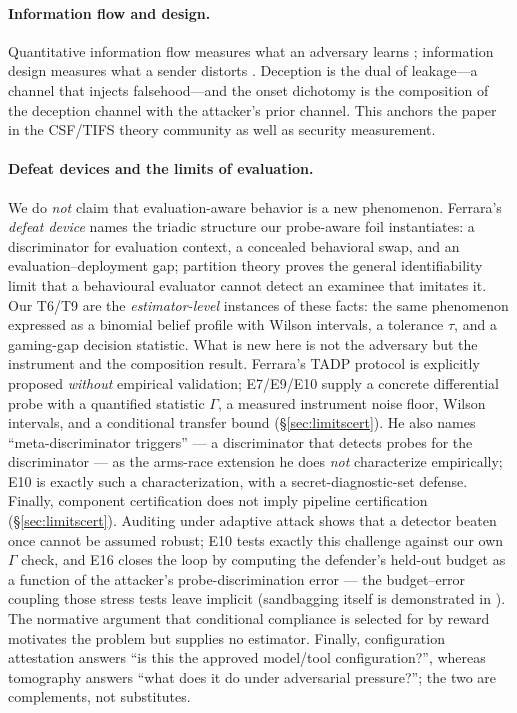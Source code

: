 \documentclass[acmsmall,review,anonymous]{acmart}
\begin{document}
\paragraph{Information flow and design.}
Quantitative information flow measures what an adversary learns
\cite{smith2009,alvim2012}; information design measures what a sender distorts
\cite{kamenica2011}. Deception is the dual of leakage---a channel that injects
falsehood---and the onset dichotomy is the composition of the deception channel
with the attacker's prior channel. This anchors the paper in the CSF/TIFS
theory community as well as security measurement.

\paragraph{Defeat devices and the limits of evaluation.}
We do \emph{not} claim that evaluation-aware behavior is a new phenomenon.
Ferrara's \emph{defeat device} \cite{ferrara2026} names the triadic structure
our probe-aware foil instantiates: a discriminator for evaluation context, a
concealed behavioral swap, and an evaluation--deployment gap; partition theory
\cite{mahran2026} proves the general identifiability limit that a behavioural
evaluator cannot detect an examinee that imitates it. Our T6/T9 are the
\emph{estimator-level} instances of these facts: the same phenomenon expressed
as a binomial belief profile with Wilson intervals, a tolerance $\tau$, and a
gaming-gap decision statistic. What is new here is not the adversary but the
instrument and the composition result. Ferrara's TADP protocol is explicitly
proposed \emph{without} empirical validation; E7/E9/E10 supply a concrete
differential probe with a quantified statistic $\Gamma$, a measured instrument
noise floor, Wilson intervals, and a conditional transfer bound
(\S\ref{sec:limitscert}). He also names ``meta-discriminator triggers'' --- a
discriminator that detects probes for the discriminator --- as the arms-race
extension he does \emph{not} characterize empirically; E10 is exactly such a
characterization, with a secret-diagnostic-set defense. Finally, component
certification does not imply pipeline certification (\S\ref{sec:limitscert}).
Auditing under adaptive attack \cite{soopal2026,duddu2026,auditinggames2025}
shows that a detector beaten once cannot be assumed robust; E10 tests exactly
this challenge against our own $\Gamma$ check, and E16 closes the loop by
computing the defender's held-out budget as a function of the attacker's
probe-discrimination error --- the budget--error coupling those stress tests
leave implicit (sandbagging itself is demonstrated in
\cite{aisandbagging2024}). The normative argument that
conditional compliance is selected for by reward \cite{baum2026} motivates the
problem but supplies no estimator. Finally, configuration attestation
\cite{ati2026} answers ``is this the approved model/tool configuration?'',
whereas tomography answers ``what does it do under adversarial pressure?'';
the two are complements, not substitutes.
\end{document}
